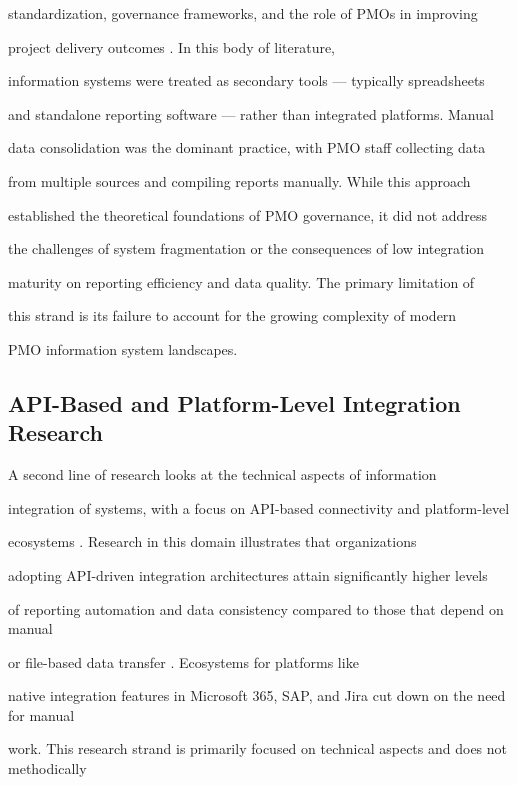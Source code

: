 standardization, governance frameworks, and the role of PMOs in improving  

project delivery outcomes \cite{hobbs2007,serrador2015,mueller2015}. In this body of literature,  

information systems were treated as secondary tools --- typically spreadsheets  

and standalone reporting software --- rather than integrated platforms. Manual  

data consolidation was the dominant practice, with PMO staff collecting data  

from multiple sources and compiling reports manually. While this approach  

established the theoretical foundations of PMO governance, it did not address  

the challenges of system fragmentation or the consequences of low integration  

maturity on reporting efficiency and data quality. The primary limitation of  

this strand is its failure to account for the growing complexity of modern  

PMO information system landscapes. 

 

\subsection{API-Based and Platform-Level Integration Research} 

A second line of research looks at the technical aspects of information   

integration of systems, with a focus on API-based connectivity and platform-level   

ecosystems \cite{hohpe2004}. Research in this domain illustrates that organizations   

adopting API-driven integration architectures attain significantly higher levels   

of reporting automation and data consistency compared to those that depend on manual   

or file-based data transfer \cite{laudon2015,pankratz2019}. Ecosystems for platforms like   

native integration features in Microsoft 365, SAP, and Jira cut down on the need for manual  

work. This research strand is primarily focused on technical aspects and does not methodically  

